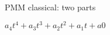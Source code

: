 \documentclass{article}
\begin{document}
PMM classical:
two parts


$a_4 t^4 + a_3 t^3 + a_2 t^2 + a_1 t + a0$
\end{document}
